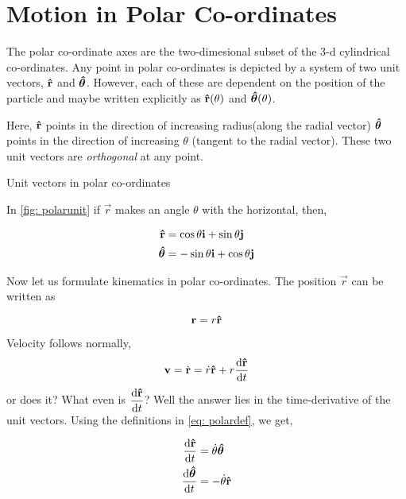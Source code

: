 \section{Motion in Polar Co-ordinates}

The polar co-ordinate axes are the two-dimesional subset of the 3-d cylindrical co-ordinates. 
Any point in polar co-ordinates is depicted by a system of two unit vectors, \(\boldsymbol{\mathbf{\hat{r}}}\) and
\(\boldsymbol{\mathbf{\hat{\theta}}}\). However, each of these are {dependent on the position of the particle} and
maybe written explicitly as \(\boldsymbol{\mathbf{\hat{r}}}(\theta)\) and \(\boldsymbol{\mathbf{\hat{\theta}}}(\theta)\).  

Here, \(\boldsymbol{\mathbf{\hat{r}}}\) points in the direction of increasing radius(along the radial vector)
\(\boldsymbol{\mathbf{\hat{\theta}}}\) points in the direction of increasing \(\theta\) (tangent to the radial vector).
These two unit vectors are \emph{orthogonal} at any point. 

\begin{marginfigure}
    \caption{Unit vectors in polar co-ordinates}
    \label{fig: polarunit}
\end{marginfigure}

In \cref{fig: polarunit} if \(\vec{r}\) makes
an angle \(\theta\) with the horizontal, then,

\begin{align}
    \label{eq: polardef}
    \boldsymbol{\mathbf{\hat{r}}} &= \cos \theta \boldsymbol{\mathbf{i}} + \sin \theta \boldsymbol{\mathbf{j}}\\
    \boldsymbol{\mathbf{\hat{\theta}}} &= -\sin \theta \boldsymbol{\mathbf{i}} + \cos \theta \boldsymbol{\mathbf{j}}
\end{align}

Now let us formulate kinematics in polar co-ordinates. The position \(\vec{r}\) can be written as

\begin{equation}
    \boldsymbol{\mathbf{r}} = r \boldsymbol{\mathbf{\hat{r}}}
\end{equation}

\noindent Velocity follows normally, 
\begin{equation}
    \boldsymbol{\mathbf{v}} = \dot{\boldsymbol{\mathbf{r}}} = \dot{r} \boldsymbol{\mathbf{\hat{r}}} + r\dv{\boldsymbol{\mathbf{\hat{r}}}}{t} 
\end{equation}
or does it? What even is \(\displaystyle\dv{\boldsymbol{\mathbf{\hat{r}}}}{t}\)? Well the answer lies in 
the time-derivative of the unit vectors. Using the definitions in \eqref{eq: polardef}, we get,

\begin{align}
    \dv{\boldsymbol{\mathbf{\hat{r}}}}{t} &= \dot{\theta} \boldsymbol{\mathbf{\hat{\theta}}}\\
    \dv{\boldsymbol{\mathbf{\hat{\theta}}}}{t} &= -\dot{\theta} \boldsymbol{\mathbf{\hat{r}}}
\end{align}

